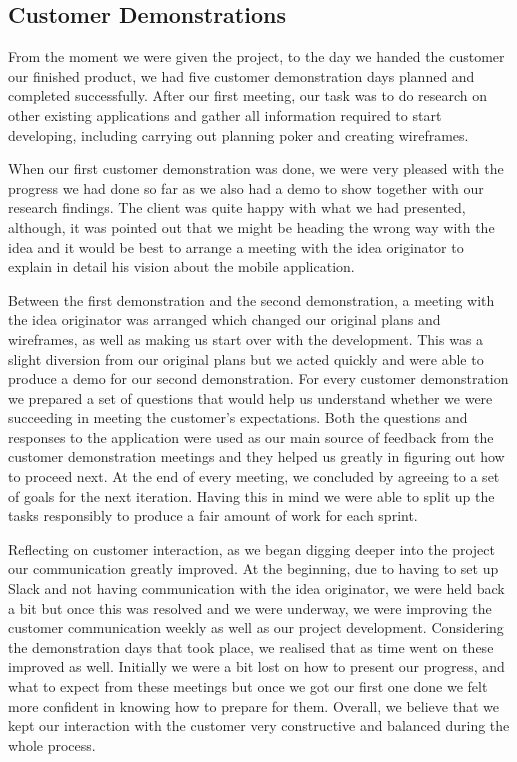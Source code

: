 \documentclass{l3proj}
\begin{document}
\subsection{Customer Demonstrations}
\label{subsec:customer demonstrations}
From the moment we were given the project, to the day we handed the customer our finished product, we had five customer demonstration days planned and completed successfully. 
After our first meeting, our task was to do research on other existing applications and gather all information required to start developing, including carrying out planning poker and creating wireframes. \par
When our first customer demonstration was done, we were very pleased with the progress we had done so far as we also had a demo to show together with our research findings. The client was quite happy with what we had presented, although, it was pointed out that we might be heading the wrong way with the idea and it would be best to arrange a meeting with the idea originator to explain in detail his vision about the mobile application. \par
Between the first demonstration and the second demonstration, a meeting with the idea originator was arranged which changed our original plans and wireframes, as well as making us start over with the development. This was a slight diversion from our original plans but we acted quickly and were able to produce a demo for our second demonstration. For every customer demonstration we prepared a set of questions that would help us understand whether we were succeeding in meeting the customer's expectations. Both the questions and responses to the application were used as our main source of feedback from the customer demonstration meetings and they helped us greatly in figuring out how to proceed next. At the end of every meeting, we concluded by agreeing to a set of goals for the next iteration. Having this in mind we were able to split up the tasks responsibly to produce a fair amount of work for each sprint.\par
Reflecting on customer interaction, as we began digging deeper into the project our communication greatly improved. At the beginning, due to having to set up Slack and not having communication with the idea originator, we were held back a bit but once this was resolved and we were underway, we were improving the customer communication weekly as well as our project development. Considering the demonstration days that took place, we realised that as time went on these improved as well. Initially we were a bit lost on how to present our progress, and what to expect from these meetings but once we got our first one done we felt more confident in knowing how to prepare for them. Overall, we believe that we kept our interaction with the customer very constructive and balanced during the whole process.
\end{document}
